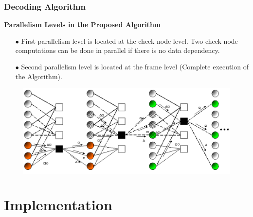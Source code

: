 \documentclass{beamer}
\begin{document}
\begin{frame}
  \frametitle{Decoding Algorithm}
	\textbf{Parallelism Levels in the Proposed Algorithm}
\begin{itemize}
  \item[$\bullet$ ] First parallelism level is located at the check node level. Two check node computations can be done in parallel if there is no data dependency.
\item[$\bullet$ ] Second parallelism level is located at the frame level (Complete execution of the Algorithm).
\end{itemize}

\begin{figure}[h]
\begin{centering}
\includegraphics[scale=0.3]{img/decoding.png}
\end{centering}
\end{figure}
\end{frame}

\section{Implementation}
\end{document}

